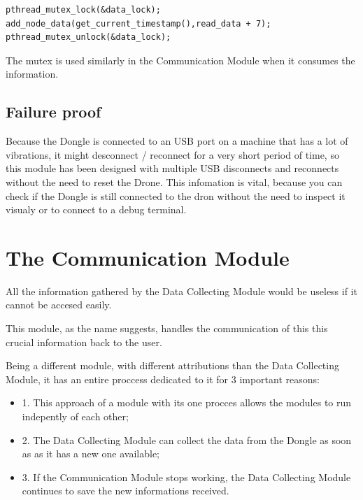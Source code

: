 \lstset{numbers=none, mathescape=true, nolol=false,caption=Data Collection use of mutex,label=lst:task}
\begin{lstlisting}
pthread_mutex_lock(&data_lock); 
add_node_data(get_current_timestamp(),read_data + 7);
pthread_mutex_unlock(&data_lock);
\end{lstlisting}

The mutex is used similarly in the Communication Module when it consumes the information.


\subsection{Failure proof}

Because the Dongle is connected to an USB port on a machine that has a lot of vibrations, it might desconnect / reconnect for a very short period of time, so this module has been designed  with multiple USB disconnects and reconnects without the need to reset the Drone. This infomation is vital, because you can check if the Dongle is still connected to the dron without the need to inspect it visualy or to connect to a debug terminal.

\section{The Communication Module}

All the information gathered by the Data Collecting Module would be useless if it cannot be accesed easily. 

This module, as the name suggests, handles the communication of this this crucial information back to the user.

Being a different module, with different attributions than the Data Collecting Module, it has an entire proccess dedicated to it for 3 important reasons:
\begin{itemize}

\item 1. This approach of a module with its one procces allows the modules to run indepently of each other;
\item 2. The Data Collecting Module can collect the data from the Dongle as soon as as it has a new one available;
\item 3. If the Communication Module stops working, the Data Collecting Module continues to save the new informations received. 

\end{itemize}

